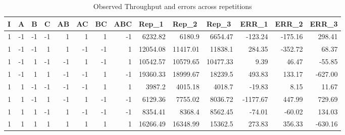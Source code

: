 \documentclass[11pt,a4paper]{article}
\begin{document}
\begin{table}[H]
	\caption{Observed Throughput and errors across repetitions}
	\centering
	\begin{tabular}{|r|r|r|r|r|r|r|r|r|r|r|r|r|r|}
		\hline
		\multicolumn{1}{|l|}{I} & \multicolumn{1}{l|}{A} & \multicolumn{1}{l|}{B} & \multicolumn{1}{l|}{C} & \multicolumn{1}{l|}{AB} & \multicolumn{1}{l|}{AC} & \multicolumn{1}{l|}{BC} & \multicolumn{1}{l|}{ABC} & \multicolumn{1}{l|}{Rep\_1} & \multicolumn{1}{l|}{Rep\_2} & \multicolumn{1}{l|}{Rep\_3} & \multicolumn{1}{l|}{ERR\_1} & \multicolumn{1}{l|}{ERR\_2} & \multicolumn{1}{l|}{ERR\_3} \\ \hline
		1 & -1 & -1 & -1 & 1 & 1 & 1 & -1 & 6232.82 & 6180.9 & 6654.47 & -123.24 & -175.16 & 298.41 \\ \hline
		1 & -1 & -1 & 1 & 1 & -1 & -1 & 1 & 12054.08 & 11417.01 & 11838.1 & 284.35 & -352.72 & 68.37 \\ \hline
		1 & -1 & 1 & -1 & -1 & 1 & -1 & 1 & 10542.57 & 10579.65 & 10477.33 & 9.39 & 46.47 & -55.85 \\ \hline
		1 & -1 & 1 & 1 & -1 & -1 & 1 & -1 & 19360.33 & 18999.67 & 18239.5 & 493.83 & 133.17 & -627.00 \\ \hline
		1 & 1 & -1 & -1 & -1 & -1 & 1 & 1 & 3987.2 & 4015.18 & 4018.7 & -19.83 & 8.15 & 11.67 \\ \hline
		1 & 1 & -1 & 1 & -1 & 1 & -1 & -1 & 6129.36 & 7755.02 & 8036.72 & -1177.67 & 447.99 & 729.69 \\ \hline
		1 & 1 & 1 & -1 & 1 & -1 & -1 & -1 & 8354.41 & 8368.4 & 8562.45 & -74.01 & -60.02 & 134.03 \\ \hline
		1 & 1 & 1 & 1 & 1 & 1 & 1 & 1 & 16266.49 & 16348.99 & 15362.5 & 273.83 & 356.33 & -630.16 \\ \hline
	\end{tabular}
	\label{}
\end{table}
\end{document}

